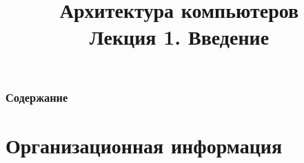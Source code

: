 \newcommand{\h}{handout,%
}



\title[Архитектура компьютеров. Лекция 1]{Архитектура компьютеров\texorpdfstring{\\}{ }Лекция 1. Введение}



\begin{frame}
\titlepage
\end{frame}

\begin{frame}
\frametitle{Содержание}
\tableofcontents[hideallsubsections]
\end{frame}

\section {Организационная информация}

